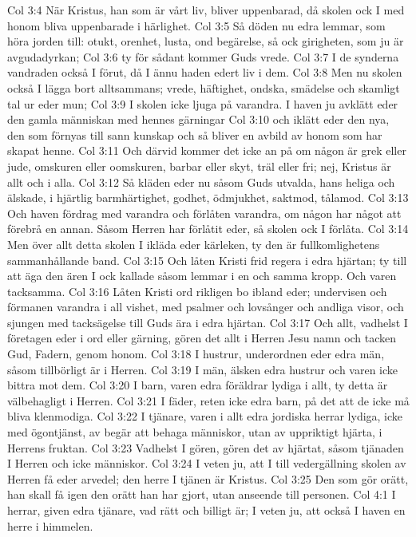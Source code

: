 Col 3:4  När Kristus, han som är vårt liv, bliver uppenbarad, då skolen ock I med honom bliva uppenbarade i härlighet.
Col 3:5  Så döden nu edra lemmar, som höra jorden till: otukt, orenhet, lusta, ond begärelse, så ock girigheten, som ju är avgudadyrkan;
Col 3:6  ty för sådant kommer Guds vrede.
Col 3:7  I de synderna vandraden också I förut, då I ännu haden edert liv i dem.
Col 3:8  Men nu skolen också I lägga bort alltsammans; vrede, häftighet, ondska, smädelse och skamligt tal ur eder mun;
Col 3:9  I skolen icke ljuga på varandra. I haven ju avklätt eder den gamla människan med hennes gärningar
Col 3:10  och iklätt eder den nya, den som förnyas till sann kunskap och så bliver en avbild av honom som har skapat henne.
Col 3:11  Och därvid kommer det icke an på om någon är grek eller jude, omskuren eller oomskuren, barbar eller skyt, träl eller fri; nej, Kristus är allt och i alla.
Col 3:12  Så kläden eder nu såsom Guds utvalda, hans heliga och älskade, i hjärtlig barmhärtighet, godhet, ödmjukhet, saktmod, tålamod.
Col 3:13  Och haven fördrag med varandra och förlåten varandra, om någon har något att förebrå en annan. Såsom Herren har förlåtit eder, så skolen ock I förlåta.
Col 3:14  Men över allt detta skolen I ikläda eder kärleken, ty den är fullkomlighetens sammanhållande band.
Col 3:15  Och låten Kristi frid regera i edra hjärtan; ty till att äga den ären I ock kallade såsom lemmar i en och samma kropp. Och varen tacksamma.
Col 3:16  Låten Kristi ord rikligen bo ibland eder; undervisen och förmanen varandra i all vishet, med psalmer och lovsånger och andliga visor, och sjungen med tacksägelse till Guds ära i edra hjärtan.
Col 3:17  Och allt, vadhelst I företagen eder i ord eller gärning, gören det allt i Herren Jesu namn och tacken Gud, Fadern, genom honom.
Col 3:18  I hustrur, underordnen eder edra män, såsom tillbörligt är i Herren.
Col 3:19  I män, älsken edra hustrur och varen icke bittra mot dem.
Col 3:20  I barn, varen edra föräldrar lydiga i allt, ty detta är välbehagligt i Herren.
Col 3:21  I fäder, reten icke edra barn, på det att de icke må bliva klenmodiga.
Col 3:22  I tjänare, varen i allt edra jordiska herrar lydiga, icke med ögontjänst, av begär att behaga människor, utan av uppriktigt hjärta, i Herrens fruktan.
Col 3:23  Vadhelst I gören, gören det av hjärtat, såsom tjänaden I Herren och icke människor.
Col 3:24  I veten ju, att I till vedergällning skolen av Herren få eder arvedel; den herre I tjänen är Kristus.
Col 3:25  Den som gör orätt, han skall få igen den orätt han har gjort, utan anseende till personen.
Col 4:1  I herrar, given edra tjänare, vad rätt och billigt är; I veten ju, att också I haven en herre i himmelen.
